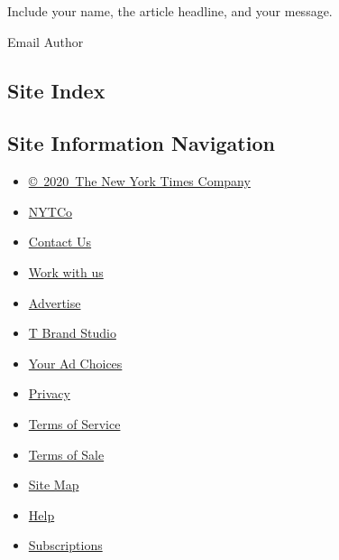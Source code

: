 Include your name, the article headline, and your message.

Email Author

\hypertarget{site-index}{%
\subsection{Site Index}\label{site-index}}

\hypertarget{site-information-navigation}{%
\subsection{Site Information
Navigation}\label{site-information-navigation}}

\begin{itemize}
\tightlist
\item
  \href{https://help.nytimes.com/hc/en-us/articles/115014792127-Copyright-notice}{©~2020~The
  New York Times Company}
\end{itemize}

\begin{itemize}
\tightlist
\item
  \href{https://www.nytco.com/}{NYTCo}
\item
  \href{https://help.nytimes.com/hc/en-us/articles/115015385887-Contact-Us}{Contact
  Us}
\item
  \href{https://www.nytco.com/careers/}{Work with us}
\item
  \href{https://nytmediakit.com/}{Advertise}
\item
  \href{http://www.tbrandstudio.com/}{T Brand Studio}
\item
  \href{https://www.nytimes.com/privacy/cookie-policy\#how-do-i-manage-trackers}{Your
  Ad Choices}
\item
  \href{https://www.nytimes.com/privacy}{Privacy}
\item
  \href{https://help.nytimes.com/hc/en-us/articles/115014893428-Terms-of-service}{Terms
  of Service}
\item
  \href{https://help.nytimes.com/hc/en-us/articles/115014893968-Terms-of-sale}{Terms
  of Sale}
\item
  \href{https://spiderbites.nytimes.com}{Site Map}
\item
  \href{https://help.nytimes.com/hc/en-us}{Help}
\item
  \href{https://www.nytimes.com/subscription?campaignId=37WXW}{Subscriptions}
\end{itemize}
